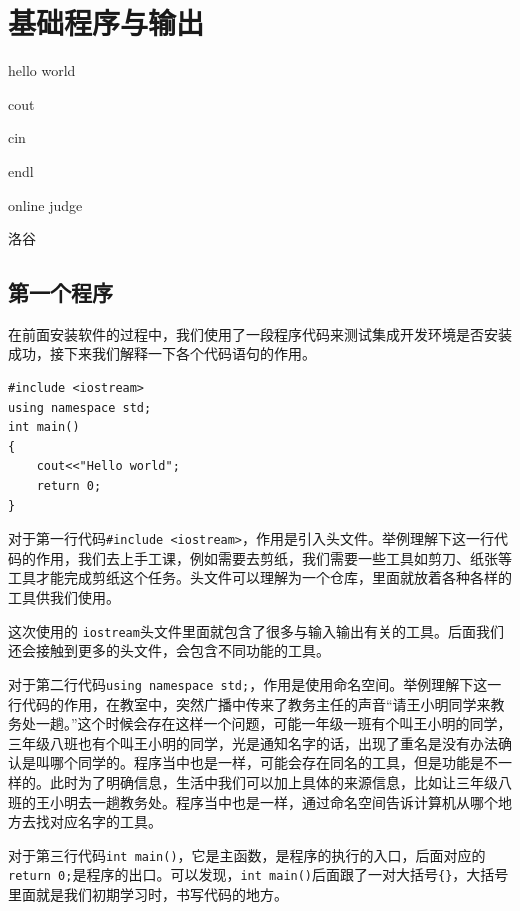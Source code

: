 \chapter{基础程序与输出}
\begin{introduction}
	\item hello world
	\item cout
	\item cin
	\item endl
	\item online judge
	\item 洛谷
\end{introduction}

\section{第一个程序}
在前面安装软件的过程中，我们使用了一段程序代码来测试集成开发环境是否安装成功，接下来我们解释一下各个代码语句的作用。

\begin{verbatim}
#include <iostream>
using namespace std;
int main()
{
	cout<<"Hello world";
	return 0;
}
\end{verbatim}

对于第一行代码\texttt{\#include <iostream>}，作用是引入头文件。举例理解下这一行代码的作用，我们去上手工课，例如需要去剪纸，我们需要一些工具如剪刀、纸张等工具才能完成剪纸这个任务。头文件可以理解为一个仓库，里面就放着各种各样的工具供我们使用。

这次使用的 \texttt{iostream}头文件里面就包含了很多与输入输出有关的工具。后面我们还会接触到更多的头文件，会包含不同功能的工具。

对于第二行代码\texttt{using namespace std;}，作用是使用命名空间。举例理解下这一行代码的作用，在教室中，突然广播中传来了教务主任的声音“请王小明同学来教务处一趟。”这个时候会存在这样一个问题，可能一年级一班有个叫王小明的同学，三年级八班也有个叫王小明的同学，光是通知名字的话，出现了重名是没有办法确认是叫哪个同学的。程序当中也是一样，可能会存在同名的工具，但是功能是不一样的。此时为了明确信息，生活中我们可以加上具体的来源信息，比如让三年级八班的王小明去一趟教务处。程序当中也是一样，通过命名空间告诉计算机从哪个地方去找对应名字的工具。

对于第三行代码\texttt{int main()}，它是主函数，是程序的执行的入口，后面对应的\texttt{return 0;}是程序的出口。可以发现，\texttt{int main()}后面跟了一对大括号\texttt{\{\}}，大括号里面就是我们初期学习时，书写代码的地方。

